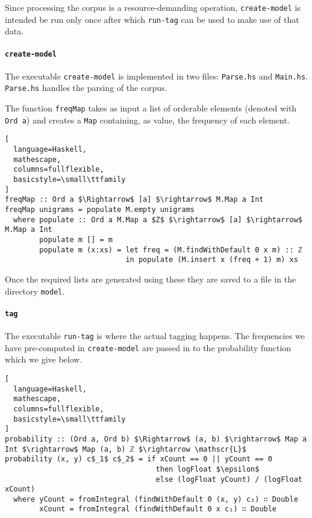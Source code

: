 \documentclass{article}
\begin{document}
Since processing the corpus is a resource-demanding operation,
\texttt{create-model} is intended be run only once after which \texttt{run-tag}
can be used to make use of that data.

\paragraph{\texttt{create-model}}
The executable \texttt{create-model} is implemented in two files:
\texttt{Parse.hs} and \texttt{Main.hs}. \texttt{Parse.hs} handles the parsing of
the corpus.

The function \texttt{freqMap} takes as input a list of orderable elements
(denoted with \texttt{Ord a}) and creates a \texttt{Map} containing, as value,
the frequency of each element.

\begin{lstlisting}[
  language=Haskell,
  mathescape,
  columns=fullflexible,
  basicstyle=\small\ttfamily
]
freqMap :: Ord a $\Rightarrow$ [a] $\rightarrow$ M.Map a Int
freqMap unigrams = populate M.empty unigrams
  where populate :: Ord a M.Map a $Z$ $\rightarrow$ [a] $\rightarrow$ M.Map a Int
        populate m [] = m
        populate m (x:xs) = let freq = (M.findWithDefault 0 x m) :: ℤ
                            in populate (M.insert x (freq + 1) m) xs
\end{lstlisting}
Once the required lists are generated using these they are saved to a file in
the directory \texttt{model}.

\paragraph{\texttt{tag}}

The executable \texttt{run-tag} is where the actual tagging happens. The
frequencies we have pre-computed in \texttt{create-model} are passed in to the
probability function which we give below.
\begin{lstlisting}[
  language=Haskell,
  mathescape,
  columns=fullflexible,
  basicstyle=\small\ttfamily
]
probability :: (Ord a, Ord b) $\Rightarrow$ (a, b) $\rightarrow$ Map a Int $\rightarrow$ Map (a, b) ℤ $\rightarrow \mathscr{L}$
probability (x, y) c$_1$ c$_2$ = if xCount == 0 || yCount == 0
                                   then logFloat $\epsilon$
                                   else (logFloat yCount) / (logFloat xCount)
  where yCount = fromIntegral (findWithDefault 0 (x, y) c₂) ∷ Double
        xCount = fromIntegral (findWithDefault 0 x c₁) ∷ Double
\end{lstlisting}
\end{document}
